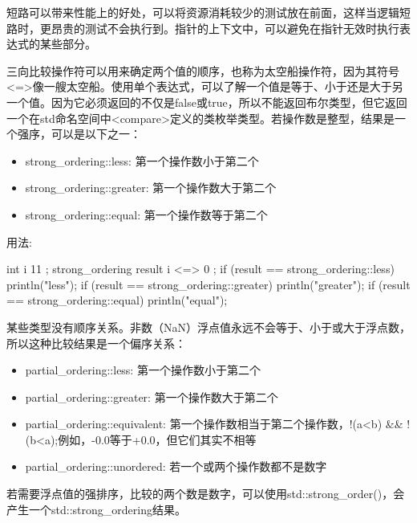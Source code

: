 短路可以带来性能上的好处，可以将资源消耗较少的测试放在前面，这样当逻辑短路时，更昂贵的测试不会执行到。指针的上下文中，可以避免在指针无效时执行表达式的某些部分。


三向比较操作符可以用来确定两个值的顺序，也称为太空船操作符，因为其符号<=>像一艘太空船。使用单个表达式，可以了解一个值是等于、小于还是大于另一个值。因为它必须返回的不仅是false或true，所以不能返回布尔类型，但它返回一个在std命名空间中<compare>定义的类枚举类型。若操作数是整型，结果是一个强序，可以是以下之一：

\begin{itemize}
\item
strong\_ordering::less: 第一个操作数小于第二个

\item
strong\_ordering::greater: 第一个操作数大于第二个

\item
strong\_ordering::equal: 第一个操作数等于第二个
\end{itemize}

用法:

\begin{cpp}
int i { 11 };
strong_ordering result { i <=> 0 };
if (result == strong_ordering::less) { println("less"); }
if (result == strong_ordering::greater) { println("greater"); }
if (result == strong_ordering::equal) { println("equal"); }
\end{cpp}

某些类型没有顺序关系。非数（NaN）浮点值永远不会等于、小于或大于浮点数，所以这种比较结果是一个偏序关系：

\begin{itemize}
\item
partial\_ordering::less: 第一个操作数小于第二个

\item
partial\_ordering::greater: 第一个操作数大于第二个

\item
partial\_ordering::equivalent: 第一个操作数相当于第二个操作数，!(a<b) \&\& !(b<a);例如，-0.0等于+0.0，但它们其实不相等

\item
partial\_ordering::unordered: 若一个或两个操作数都不是数字
\end{itemize}

若需要浮点值的强排序，比较的两个数是数字，可以使用std::strong\_order()，会产生一个std::strong\_ordering结果。

